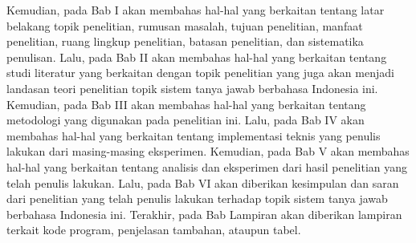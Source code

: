 Kemudian, pada Bab I akan membahas hal-hal yang berkaitan tentang latar belakang topik penelitian, rumusan masalah, tujuan penelitian, manfaat penelitian, ruang lingkup penelitian, batasan penelitian, dan sistematika penulisan. Lalu, pada Bab II akan membahas hal-hal yang berkaitan tentang studi literatur yang berkaitan dengan topik penelitian yang juga akan menjadi landasan teori penelitian topik sistem tanya jawab berbahasa Indonesia ini. Kemudian, pada Bab III akan membahas hal-hal yang berkaitan tentang metodologi yang digunakan pada penelitian ini. Lalu, pada Bab IV akan membahas hal-hal yang berkaitan tentang implementasi teknis yang penulis lakukan dari masing-masing eksperimen. Kemudian, pada Bab V akan membahas hal-hal yang berkaitan tentang analisis dan eksperimen dari hasil penelitian yang telah penulis lakukan. Lalu, pada Bab VI akan diberikan kesimpulan dan saran dari penelitian yang telah penulis lakukan terhadap topik sistem tanya jawab berbahasa Indonesia ini. Terakhir, pada Bab Lampiran akan diberikan lampiran terkait kode program, penjelasan tambahan, ataupun tabel.